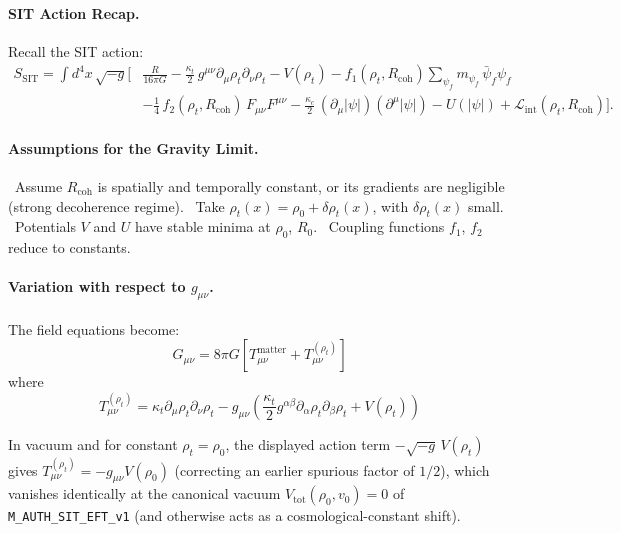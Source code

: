\paragraph{SIT Action Recap.}
Recall the SIT action:
\begin{align*}
S_{\mathrm{SIT}} = \int d^4x\,\sqrt{-g}\Bigg[
    &\frac{R}{16\pi G}
    - \frac{\kappa_t}{2}\,g^{\mu\nu}\partial_\mu\rho_t\partial_\nu\rho_t - V(\rho_t)
    - f_1(\rho_t, R_{\mathrm{coh}})\sum_{\psi_f} m_{\psi_f}\,\bar\psi_f\psi_f \\
    &- \frac{1}{4}\,f_2(\rho_t, R_{\mathrm{coh}})\,F_{\mu\nu}F^{\mu\nu}
    - \frac{\kappa_c}{2}\,(\partial_\mu |\psi|)(\partial^\mu |\psi|) - U(|\psi|)
    + \mathcal{L}_{\text{int}}(\rho_t, R_{\mathrm{coh}})
\Bigg].
\end{align*}

\paragraph{Assumptions for the Gravity Limit.}
\noindent\textbullet~Assume $R_{\mathrm{coh}}$ is spatially and temporally constant, or its gradients are negligible (strong decoherence regime).
\noindent\textbullet~Take $\rho_t(x) = \rho_0 + \delta \rho_t(x)$, with $\delta \rho_t(x)$ small.
\noindent\textbullet~Potentials $V$ and $U$ have stable minima at $\rho_0$, $R_0$.
\noindent\textbullet~Coupling functions $f_1$, $f_2$ reduce to constants.

\paragraph{Variation with respect to $g_{\mu\nu}$.}
The field equations become:
\[
G_{\mu\nu} = 8\pi G \left[ T_{\mu\nu}^{\text{matter}} + T_{\mu\nu}^{(\rho_t)} \right]
\]
where
\[
T_{\mu\nu}^{(\rho_t)} = \kappa_t \partial_\mu \rho_t \partial_\nu \rho_t - g_{\mu\nu} \left( \frac{\kappa_t}{2} g^{\alpha\beta} \partial_\alpha \rho_t \partial_\beta \rho_t + V(\rho_t) \right)
\]

In vacuum and for constant $\rho_t = \rho_0$, the displayed action term $-\sqrt{-g}\,V(\rho_t)$ gives $T_{\mu\nu}^{(\rho_t)} = -g_{\mu\nu} V(\rho_0)$ (correcting an earlier spurious factor of $1/2$), which vanishes identically at the canonical vacuum $V_{\mathrm{tot}}(\rho_0, v_0) = 0$ of \texttt{M\_AUTH\_SIT\_EFT\_v1} (and otherwise acts as a cosmological-constant shift).

